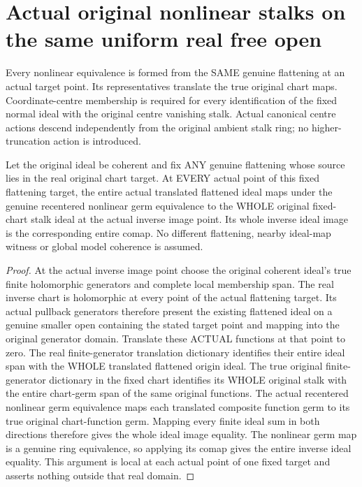 \chapter{Actual original nonlinear stalks on the same uniform real free open}

Every nonlinear equivalence is formed from the SAME genuine flattening at
an actual target point. Its representatives translate the true original
chart maps. Coordinate-centre membership is required for every identification
of the fixed normal ideal with the original centre vanishing stalk. Actual
canonical centre actions descend independently from the original ambient
stalk ring; no higher-truncation action is introduced.

\begin{lemma}
\label{hir:real-domain-fixed-flattening-all-original-whole-stalks}
\leanok
Let the original ideal be coherent and fix ANY genuine flattening whose
source lies in the real original chart target. At EVERY actual point of
this fixed flattening target, the entire actual translated flattened ideal
maps under the genuine recentered nonlinear germ equivalence to the WHOLE
original fixed-chart stalk ideal at the actual inverse image point. Its
whole inverse ideal image is the corresponding entire comap. No different
flattening, nearby ideal-map witness or global model coherence is assumed.
\end{lemma}
\begin{proof}
At the actual inverse image point choose the original coherent ideal's true
finite holomorphic generators and complete local membership span. The real
inverse chart is holomorphic at every point of the actual flattening target.
Its actual pullback generators therefore present the existing flattened
ideal on a genuine smaller open containing the stated target point and
mapping into the original generator domain. Translate these ACTUAL functions
at that point to zero. The real finite-generator translation dictionary
identifies their entire ideal span with the WHOLE translated flattened
origin ideal. The true original finite-generator dictionary in the fixed
chart identifies its WHOLE original stalk with the entire chart-germ span
of the same original functions. The actual recentered nonlinear germ
equivalence maps each translated composite function germ to its true
original chart-function germ. Mapping every finite ideal sum in both
directions therefore gives the whole ideal image equality. The nonlinear
germ map is a genuine ring equivalence, so applying its comap gives the
entire inverse ideal equality. This argument is local at each actual point
of one fixed target and asserts nothing outside that real domain.
\end{proof}


